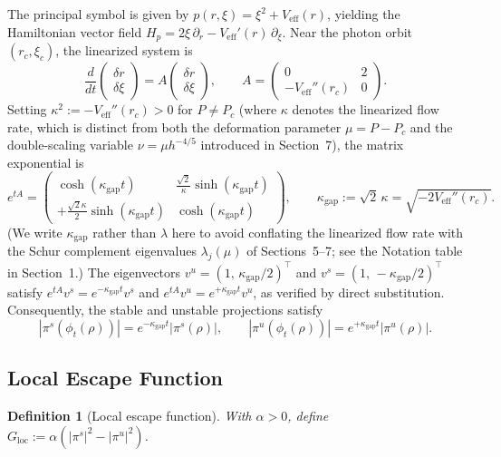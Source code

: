 \documentclass[12pt,a4paper]{amsart}
\newtheorem{definition}[theorem]{Definition}
\theoremstyle{remark}
\begin{document}
The principal symbol is given by $p(r,\xi) = \xi^2 + V_{\mathrm{eff}}(r)$, yielding the
Hamiltonian vector field $H_p = 2\xi\,\partial_r - V_{\mathrm{eff}}'(r)\,\partial_\xi$.
Near the photon orbit $(r_c, \xi_c)$, the linearized system is
\[
\frac{d}{dt}\begin{pmatrix}\delta r \\ \delta\xi\end{pmatrix}
= A\begin{pmatrix}\delta r \\ \delta\xi\end{pmatrix},
\qquad
A = \begin{pmatrix} 0 & 2 \\ -V_{\mathrm{eff}}''(r_c) & 0 \end{pmatrix}.
\]
Setting $\kappa^2 := -V_{\mathrm{eff}}''(r_c) > 0$ for $P \neq P_c$
(where $\kappa$ denotes the linearized flow rate, which is distinct from
both the deformation parameter $\mu = P - P_c$ and the double-scaling variable
$\nu = \mu h^{-4/5}$ introduced in Section~7),
the matrix exponential is
\[
e^{tA} = \begin{pmatrix}
\cosh(\kappa_{\mathrm{gap}} t) & \tfrac{\sqrt{2}}{\kappa}\sinh(\kappa_{\mathrm{gap}} t) \\[4pt]
+\tfrac{\sqrt{2}\kappa}{2}\sinh(\kappa_{\mathrm{gap}} t) & \cosh(\kappa_{\mathrm{gap}} t)
\end{pmatrix},
\qquad \kappa_{\mathrm{gap}} := \sqrt{2}\,\kappa = \sqrt{-2V_{\mathrm{eff}}''(r_c)}.
\]
(We write $\kappa_{\mathrm{gap}}$ rather than $\lambda$ here to avoid conflating the
linearized flow rate with the Schur complement eigenvalues $\lambda_j(\mu)$ of
Sections~5--7; see the Notation table in Section~1.)
The eigenvectors $v^u = (1,\,\kappa_{\mathrm{gap}}/2)^\top$ and $v^s = (1,\,-\kappa_{\mathrm{gap}}/2)^\top$
satisfy $e^{tA}v^s = e^{-\kappa_{\mathrm{gap}} t}v^s$ and $e^{tA}v^u = e^{+\kappa_{\mathrm{gap}} t}v^u$,
as verified by direct substitution. Consequently, the stable and unstable projections satisfy
\[
|\pi^s(\phi_t(\rho))| = e^{-\kappa_{\mathrm{gap}} t}|\pi^s(\rho)|,
\qquad
|\pi^u(\phi_t(\rho))| = e^{+\kappa_{\mathrm{gap}} t}|\pi^u(\rho)|.
\]

\subsection{Local Escape Function}

\begin{definition}[Local escape function]
With $\alpha > 0$, define
$G_{\mathrm{loc}} := \alpha(|\pi^s|^2 - |\pi^u|^2)$.
\end{definition}
\end{document}
